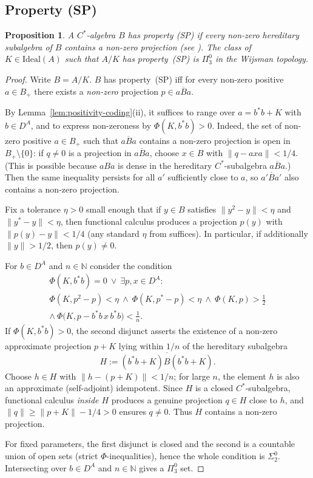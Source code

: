 \documentclass[12pt,fleqn,a4paper]{amsart}
\renewcommand{\ge}{\geqslant}
\numberwithin{equation}{section}
\newtheorem{proposition}[theorem]{Proposition}
\theoremstyle{definition}
\newcommand{\N}{\mathbb{N}}
\newcommand{\Ideal}{\mathrm{Ideal}}
\begin{document}
\subsection{Property (SP)}

\begin{proposition}\label{prop:SP}
A $C^*$-algebra $B$ has \emph{property (SP)} if every non-zero hereditary subalgebra
of $B$ contains a non-zero projection (see \cite[V.2.2.14]{BlackadarOA}).
The class of $K\in\Ideal(A)$ such that $A/K$ has property~(SP)
is $\Pi^0_3$ in the Wijsman topology.
\end{proposition}

\begin{proof}
Write $B=A/K$.
$B$ has property~(SP) iff for every non-zero positive $a\in B_+$ there exists a
\emph{non-zero} projection $p\in\overline{aBa}$.

By Lemma~\ref{lem:positivity-coding}(ii), it suffices to range over $a=b^*b+K$
with $b\in D^A$, and to express non-zeroness by $\Phi(K,b^*b)>0$.
Indeed, the set of non-zero positive $a\in B_+$ such that $\overline{aBa}$
contains a non-zero projection is open in $B_+\setminus\{0\}$: if
$q\neq 0$ is a projection in $\overline{aBa}$, choose
$x\in B$ with
$\|q-axa\|<1/4$.
(This is possible because $aBa$ is dense in the hereditary $C^*$-subalgebra $\overline{aBa}$.)
Then the same inequality persists for all $a'$ sufficiently close to $a$,
so $\overline{a'Ba'}$ also contains a non-zero projection.

Fix a tolerance $\eta>0$ small enough that if $y\in B$ satisfies
$\|y^2-y\|<\eta$ and $\|y^*-y\|<\eta$, then functional calculus produces a projection
$p(y)$ with $\|p(y)-y\|<1/4$ (any standard $\eta$ from \cite{Loring} suffices).
In particular, if additionally $\|y\|>1/2$, then $p(y)\neq 0$.

For $b\in D^A$ and $n\in\N$ consider the condition
\begin{multline*}
\Phi(K,b^*b)=0
\ \lor\ 
\exists p,x\in D^A:\\
\Phi(K,p^2-p)<\eta\ \wedge\ \Phi(K,p^*-p)<\eta\ \wedge\ \Phi(K,p)>\tfrac12\\
\wedge\ \Phi\bigl(K,p-b^*b\,x\,b^*b\bigr)<\tfrac1n.
\end{multline*}
If $\Phi(K,b^*b)>0$, the second disjunct asserts the existence of a non-zero
approximate projection $p+K$ lying within $1/n$ of the hereditary subalgebra
\[
    H:=\overline{(b^*b+K)B(b^*b+K)}.
\]
Choose $h\in H$ with $\|h-(p+K)\|<1/n$; for large $n$, the element $h$ is also
an approximate (self-adjoint) idempotent.
Since $H$ is a closed $C^*$-subalgebra, functional calculus \emph{inside $H$}
produces a genuine projection $q\in H$ close to $h$, and $\|q\|\ge\|p+K\|-1/4>0$
ensures $q\neq 0$.
Thus $H$ contains a non-zero projection.

For fixed parameters, the first disjunct is closed and the second is a countable union
of open sets (strict $\Phi$-inequalities), hence the whole condition is $\Sigma^0_2$.
Intersecting over $b\in D^A$ and $n\in\N$ gives a $\Pi^0_3$ set.
\end{proof}
\end{document}
